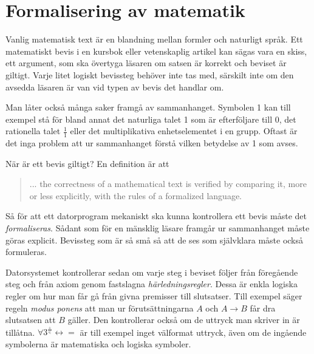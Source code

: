 \section{Formalisering av matematik}
Vanlig matematisk text är en blandning mellan formler och naturligt språk. Ett
matematiskt bevis i en kursbok eller vetenskaplig artikel kan sägas vara en
skiss, ett argument, som ska övertyga läsaren om satsen är korrekt och beviset
är giltigt. Varje litet logiskt bevissteg behöver inte tas med, särskilt inte
om den avsedda läsaren är van vid typen av bevis det handlar om.

Man låter också många saker framgå av sammanhanget. Symbolen 1 kan till exempel
stå för bland annat det naturliga talet 1 som är efterföljare till 0, det
rationella talet $\frac{1}{1}$ eller det multiplikativa enhetselementet i en
grupp. Oftast är det inga problem att ur sammanhanget förstå vilken betydelse
av 1 som avses.

När är ett bevis giltigt? En definition är att
\begin{quote}
... the correctness of a mathematical text is verified by comparing it, more or
less explicitly, with the rules of a formalized language\cite{bourbaki}.
\end{quote}

Så för att ett datorprogram mekaniskt ska kunna kontrollera ett bevis måste det
\emph{formaliseras}. Sådant som för en mänsklig läsare framgår ur sammanhanget
måste göras explicit. Bevissteg som är så små så att de ses som självklara
måste också formuleras.


Datorsystemet kontrollerar sedan om varje steg i beviset följer från föregående
steg och från axiom genom fastslagna \emph{härledningsregler}. Dessa är enkla
logiska regler om hur man får gå från givna premisser till slutsatser. Till
exempel säger regeln \emph{modus ponens} att man ur förutsättningarna $A$ och
$A \to B$ får dra slutsatsen att $B$ gäller. Den kontrollerar också om de
uttryck man skriver in är tillåtna.
$\forall 3^{\frac{+}{\in}} \leftrightarrow =$ är till exempel inget välformat
uttryck, även om de ingående symbolerna är matematiska och logiska symboler.

